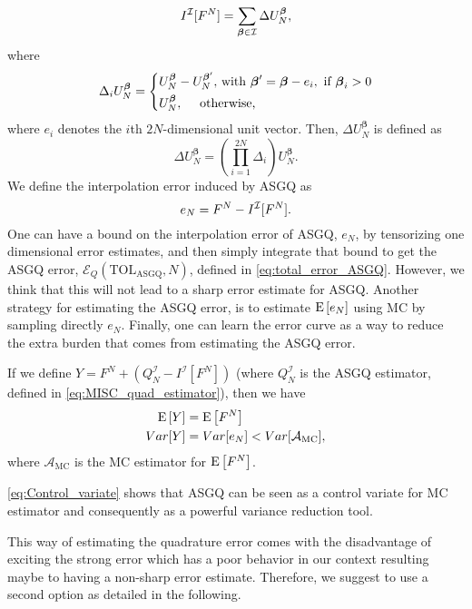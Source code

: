 \begin{equation}
I^{\mathcal{I}}[F^N]= \sum_{\boldsymbol{\beta} \in \mathcal{I}} \Delta U_N^{\boldsymbol{\beta}} ,
\end{equation}
where 
\begin{equation*}
\Delta_i U_N^{\boldsymbol{\beta}} = \left\{ 
\aligned 
 U_N^{\boldsymbol{\beta}} &- U_N^{\boldsymbol{\beta}'}  \text{, with } \boldsymbol{\beta}' =\boldsymbol{\beta} - e_i, \text{ if } \boldsymbol{\beta}_i>0 \\
 U_N^{\boldsymbol{\beta}} &, \quad  \text{ otherwise,}
\endaligned
\right.
\end{equation*}
where $e_i$ denotes the $i$th $2N$-dimensional unit vector. Then, $\Delta
U_N^{\boldsymbol{\beta}}$ is defined as
\begin{equation*}
\Delta U_N^{\boldsymbol{\beta}} = \left( \prod_{i=1}^{2N} \Delta_i \right) U_N^{\boldsymbol{\beta}}.
\end{equation*}
We define the interpolation error induced by ASGQ as
\begin{equation}
e_{N}= F^N-I^{\mathcal{I}}[F^N] .
\end{equation}
One can have a bound on the interpolation error of ASGQ, $e_{N}$, by tensorizing one dimensional error estimates, and  then simply integrate that bound to get the ASGQ  error, $\mathcal{E}_Q(\text{TOL}_{\text{ASGQ}},N)$, defined in \eqref{eq:total_error_ASGQ}. However, we think that this will  not lead to a sharp error estimate for ASGQ. Another strategy for estimating the ASGQ  error, is to estimate $\mathrm{E}\left[e_N\right]$ using MC by sampling directly $e_N$. Finally,  one can learn the error curve as a way to reduce the extra burden that comes from estimating the ASGQ error.

If we define $Y=F^N+(Q_N^{\mathcal{I}}-I^{\mathcal{I}}[F^N])$ (where $Q_N^{\mathcal{I}}$ is the ASGQ  estimator, defined in \eqref{eq:MISC_quad_estimator}), then we have
\begin{align}\label{eq:Control_variate}
\mathrm{E}\left[Y\right]&=\mathrm{E}\left[F^N\right]\nonumber\\
Var[Y]&=Var[e_N]< Var[\mathcal{A}_{\text{MC}}],
\end{align}
where $\mathcal{A}_{\text{MC}}$ is the MC estimator for $\mathrm{E}\left[F^N\right]$.

\eqref{eq:Control_variate} shows that ASGQ can be seen as a control variate for MC estimator and consequently as a powerful variance reduction tool.

This way of estimating the quadrature error comes with the disadvantage of exciting the strong error which has a poor behavior in our context resulting maybe to having a non-sharp error estimate. Therefore, we suggest to use a second option as detailed in the following.
